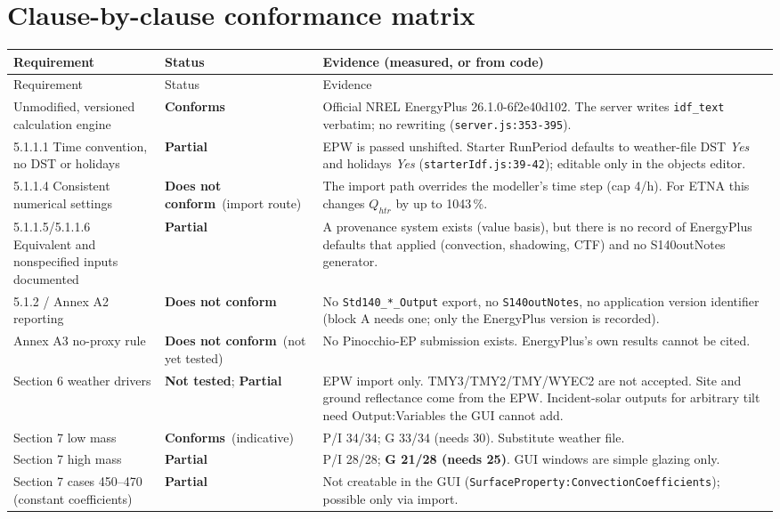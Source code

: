 \documentclass[10pt,a4paper]{article}
\newcommand{\OK}{\textcolor{ok}{\textbf{Conforms}}}
\newcommand{\NO}{\textcolor{bad}{\textbf{Does not conform}}}
\newcommand{\PART}{\textcolor{part}{\textbf{Partial}}}
\newcommand{\NT}{\textbf{Not tested}}
\newcommand{\code}[1]{\texttt{\small #1}}
\begin{document}
\section{Clause-by-clause conformance matrix}\label{sec:matrix}
{\small
\begin{longtable}{p{3.2cm}p{2.3cm}p{10.2cm}}
\toprule Requirement & Status & Evidence (measured, or from code)\\\midrule\endfirsthead
\toprule Requirement & Status & Evidence\\\midrule\endhead
Unmodified, versioned calculation engine & \OK & Official NREL EnergyPlus 26.1.0-6f2e40d102. The server writes \code{idf\_text} verbatim; no rewriting (\code{server.js:353-395}).\\
5.1.1.1 Time convention, no DST or holidays & \PART & EPW is passed unshifted. Starter RunPeriod defaults to weather-file DST \emph{Yes} and holidays \emph{Yes} (\code{starterIdf.js:39-42}); editable only in the objects editor.\\
5.1.1.4 Consistent numerical settings & \NO\ (import route) & The import path overrides the modeller's time step (cap 4/h). For ETNA this changes $Q_{htr}$ by up to 1043\,\%.\\
5.1.1.5/5.1.1.6 Equivalent and nonspecified inputs documented & \PART & A provenance system exists (value basis), but there is no record of EnergyPlus defaults that applied (convection, shadowing, CTF) and no S140outNotes generator.\\
5.1.2 / Annex A2 reporting & \NO & No \code{Std140\_*\_Output} export, no \code{S140outNotes}, no application version identifier (block A needs one; only the EnergyPlus version is recorded).\\
Annex A3 no-proxy rule & \NO\ (not yet tested) & No Pinocchio-EP submission exists. EnergyPlus's own results cannot be cited.\\
Section 6 weather drivers & \NT; \PART & EPW import only. TMY3/TMY2/TMY/WYEC2 are not accepted. Site and ground reflectance come from the EPW. Incident-solar outputs for arbitrary tilt need Output:Variables the GUI cannot add.\\
Section 7 low mass & \OK\ (indicative) & P/I 34/34; G 33/34 (needs 30). Substitute weather file.\\
Section 7 high mass & \PART & P/I 28/28; \textbf{G 21/28 (needs 25)}. GUI windows are simple glazing only.\\
Section 7 cases 450--470 (constant coefficients) & \PART & Not creatable in the GUI (\code{SurfaceProperty:ConvectionCoefficients}); possible only via import.\\

\end{longtable}}
\end{document}

